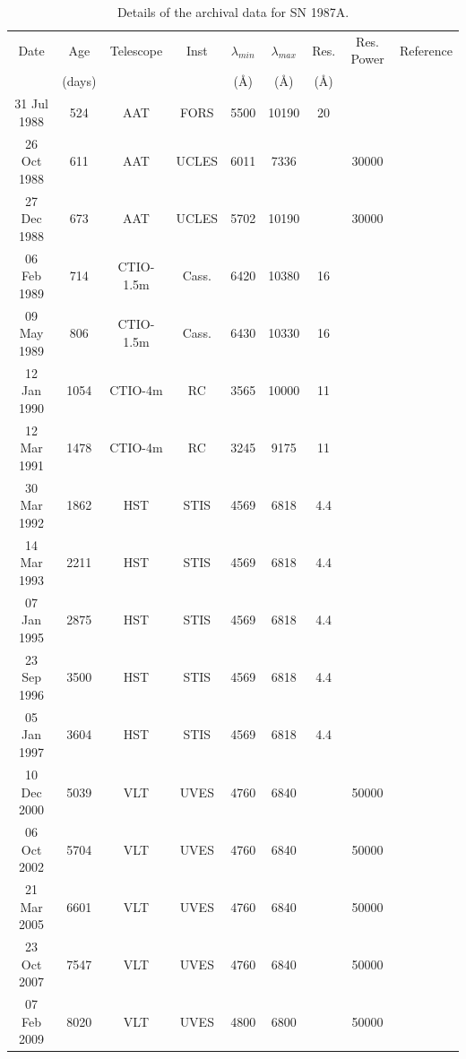 \documentclass[useAMS,usenatbib,usegraphicx]{mnras}
\begin{document}
\begin{table}
	\begin{minipage}{180mm}
	\caption{Details of the archival data for SN 1987A.}
	\label{tb:data}
  	\begin{tabular}{@{} ccccccccl @{}}
    	\hline
	Date & Age & Telescope  & Inst & $\lambda_{min}$ & $\lambda_{max}$ & Res. & Res. Power & Reference \\
	& (days) & & &(\AA) & (\AA)& (\AA)\\
	\hline
31 Jul 1988 & 524 & AAT & FORS & 5500 & 10190 & 20 & & \citet{Spyromilio1991} \\
26 Oct 1988 & 611 & AAT & UCLES & 6011 & 7336 &  & 30000 & \citet{Hanuschik1993, Spyromilio1993}\\
27 Dec 1988 & 673 & AAT & UCLES & 5702 & 10190 &  & 30000 & \citet{Hanuschik1993, Spyromilio1993}\\
06 Feb 1989 & 714 & CTIO-1.5m & Cass. & 6420 & 10380 & 16 & & \citet{Phillips1990}\\
09 May 1989 & 806 & CTIO-1.5m & Cass. & 6430 & 10330 & 16 & & \citet{Phillips1990}\\
12 Jan 1990 & 1054 & CTIO-4m & RC & 3565 & 10000 & 11 & & \cite{Suntzeff1991} \\
12 Mar 1991 & 1478 & CTIO-4m & RC & 3245 & 9175 & 11 & & \\
30 Mar 1992 & 1862 & HST & STIS & 4569 & 6818 & 4.4 &  & \citet{Wang1996}\\
14 Mar 1993 & 2211 & HST & STIS & 4569 & 6818 & 4.4 &  & \citet{Wang1996}\\
07 Jan 1995 & 2875 & HST & STIS & 4569 & 6818 & 4.4 &  & \citet{Chugai1997}\\
23 Sep 1996 & 3500 & HST & STIS & 4569 & 6818 & 4.4 &  \\ 
05 Jan 1997 & 3604 & HST & STIS & 4569 & 6818 & 4.4 &  \\
10 Dec 2000 & 5039 & VLT & UVES & 4760 & 6840 &  & 50000 & \citet{Groeningsson2006, Groeningsson2007}\\
06 Oct 2002 & 5704 & VLT & UVES & 4760 & 6840 &  & 50000 & \citet{Groeningsson2006, Groeningsson2007, Groningsson2008}\\
21 Mar 2005 & 6601 & VLT & UVES & 4760 & 6840 &  & 50000 &\citet{Groeningsson2006, Groeningsson2007}\\
23 Oct 2007 & 7547 & VLT & UVES & 4760 & 6840 &  & 50000 & \citet{Groeningsson2007}\\
07 Feb 2009 & 8020 & VLT & UVES & 4800 & 6800 &  & 50000 & \citet{Tziamtzis2010}\\
    \hline
  \end{tabular}
\end{minipage}
\end{table}
\end{document}
